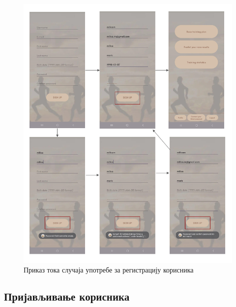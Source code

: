 \documentclass[12pt,oneside]{memoir}
\begin{document}
\begin{figure}[H]
  \centering
  \includegraphics[scale=0.85]{assets/pictures/usecases_flows/signup_flow.png}
    \caption{Приказ тока случаја употребе за регистрацију корисника}
  \label{pic:registration-flow}
\end{figure}


\newpage
\subsection*{Пријављивање корисника}
\end{document}
